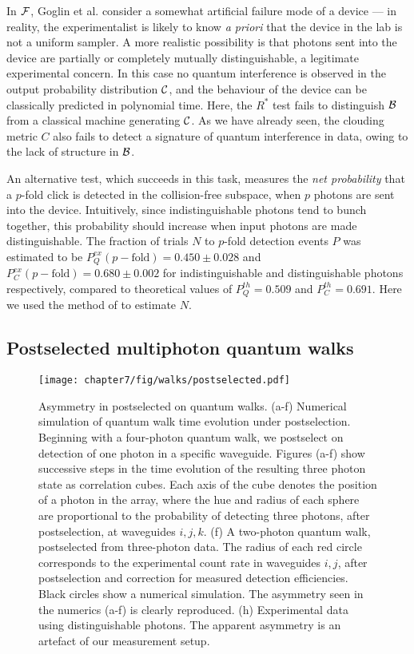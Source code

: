 In $\mathcal{F}$, Goglin et al. consider a somewhat artificial failure mode of a \bosonsampling device --- in reality, the experimentalist is likely to know \emph{a priori} that the device in the lab is not a uniform sampler. A more realistic possibility is that photons sent into the device are partially or completely mutually distinguishable, a legitimate experimental concern. In this case no quantum interference is observed in the output probability distribution $\mathcal{C}$, and the behaviour of the device can be classically predicted in polynomial time.  Here, the $R^*$ test fails to distinguish $\mathcal{B}$ from a classical machine generating $\mathcal{C}$. As we have already seen, the clouding metric $C$ also fails to detect a signature of quantum interference in \bosonsampling data, owing to the lack of structure in $\mathcal{B}$. 

An alternative test, which succeeds in this task, measures the \emph{net probability} that a $p$-fold click is detected in the collision-free subspace, when $p$ photons are sent into the device. Intuitively, since indistinguishable photons tend to bunch together, this probability should increase when input photons are made distinguishable. The fraction of trials $N$ to $p$-fold detection events $P$ was estimated to be $P_Q^{ex}(p-\text{fold}) = 0.450\pm0.028$ and $P_C^{ex}(p-\text{fold}) = 0.680\pm0.002$ for indistinguishable and distinguishable photons respectively, compared to theoretical values of $P_Q^{th}=0.509$ and $P_C^{th} = 0.691$. Here we used the method of \cite{Spagnolo2013a} to estimate $N$.

\subsection{Postselected multiphoton quantum walks}
\label{sec:postselected-multiphoton-quantum-walks}
\begin{figure}[t!]
\centering
\texttt{[image: chapter7/fig/walks/postselected.pdf]}
\caption[Asymmetry in postselected quantum walks]{
Asymmetry in postselected on quantum walks. (a-f) Numerical simulation of quantum walk time evolution under postselection. Beginning with a four-photon quantum walk, we postselect on detection of one photon in a specific waveguide. Figures (a-f) show successive steps in the time evolution of the resulting three photon state as correlation cubes. Each axis of the cube denotes the position of a photon in the array, where the hue and radius of each sphere are proportional to the probability of detecting three photons, after postselection, at waveguides $i,j,k$. (f) A two-photon quantum walk, postselected from three-photon data. The radius of each red circle corresponds to the experimental count rate in waveguides $i, j$, after postselection and correction for measured detection efficiencies. Black circles show a numerical simulation. The asymmetry seen in the numerics (a-f) is clearly reproduced. (h) Experimental data using distinguishable photons. The apparent asymmetry is an artefact of our measurement setup. }
\label{fig:postselected-walks}
\end{figure}

